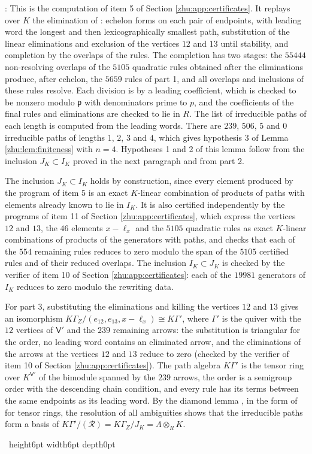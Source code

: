 \documentclass[leqno]{article}
\newcommand{\qed}{\hfill \vrule height6pt  width6pt depth0pt}
\newcommand{\ot}{\otimes}
\newenvironment{proof}[1][]{\noindent {\it Proof #1} : }{\hbox{~}\qed
\smallskip
}
\numberwithin{equation}{section}
\begin{document}
\begin{proof}
This is the computation of item 5 of Section \ref{zhu:app:certificates}. It replays over $K$ the elimination of \cite[Theorem 11.6]{Arh26}: echelon forms on each pair of endpoints, with leading word the longest and then lexicographically smallest path, substitution of the linear eliminations and exclusion of the vertices $12$ and $13$ until stability, and completion by the overlaps of the rules. The completion has two stages: the $55444$ non-resolving overlaps of the $5105$ quadratic rules obtained after the eliminations produce, after echelon, the $5659$ rules of part 1, and all overlaps and inclusions of these rules resolve. Each division is by a leading coefficient, which is checked to be nonzero modulo $\mathfrak p$ with denominators prime to $p$, and the coefficients of the final rules and eliminations are checked to lie in $R$. The list of irreducible paths of each length is computed from the leading words. There are $239$, $506$, $5$ and $0$ irreducible paths of lengths $1$, $2$, $3$ and $4$, which gives hypothesis 3 of Lemma \ref{zhu:lem:finiteness} with $n = 4$. Hypotheses 1 and 2 of this lemma follow from the inclusion $J_K \subset I_K$ proved in the next paragraph and from part 2.

The inclusion $J_K \subset I_K$ holds by construction, since every element produced by the program of item 5 is an exact $K$-linear combination of products of paths with elements already known to lie in $I_K$. It is also certified independently by the programs of item 11 of Section \ref{zhu:app:certificates}, which express the vertices $12$ and $13$, the $46$ elements $x - \ell_x$ and the $5105$ quadratic rules as exact $K$-linear combinations of products of the generators with paths, and checks that each of the $554$ remaining rules reduces to zero modulo the span of the $5105$ certified rules and of their reduced overlaps. The inclusion $I_K \subset J_K$ is checked by the verifier of item 10 of Section \ref{zhu:app:certificates}: each of the $19981$ generators of $I_K$ reduces to zero modulo the rewriting data.

For part 3, substituting the eliminations and killing the vertices $12$ and $13$ gives an isomorphism $K\Gamma_Z/(e_{12}, e_{13}, x - \ell_x) \cong K\Gamma'$, where $\Gamma'$ is the quiver with the $12$ vertices of $\mathsf V'$ and the $239$ remaining arrows: the substitution is triangular for the order, no leading word contains an eliminated arrow, and the eliminations of the arrows at the vertices $12$ and $13$ reduce to zero (checked by the verifier of item 10 of Section \ref{zhu:app:certificates}). The path algebra $K\Gamma'$ is the tensor ring over $K^{\mathsf V'}$ of the bimodule spanned by the $239$ arrows, the order is a semigroup order with the descending chain condition, and every rule has its terms between the same endpoints as its leading word. By the diamond lemma \cite[Theorem 1.2 p.~181]{Ber78}, in the form of \cite[Theorem 6.1 p.~196]{Ber78} for tensor rings, the resolution of all ambiguities shows that the irreducible paths form a basis of $K\Gamma'/(\mathcal R) = K\Gamma_Z/J_K = \Lambda \ot_R K$.


\end{proof}
\end{document}

